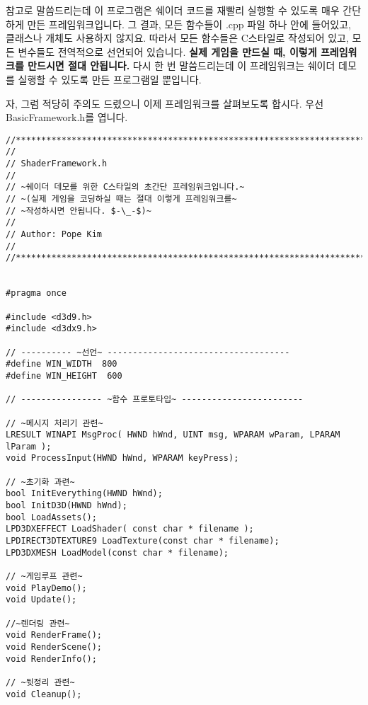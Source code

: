 참고로 말씀드리는데 이 프로그램은 쉐이더 코드를 재빨리 실행할 수 있도록 매우 간단하게 만든 프레임워크입니다. 그 결과, 모든 함수들이 .cpp 파일 하나 안에 들어있고, 클래스나 개체도 사용하지 않지요. 따라서 모든 함수들은 C스타일로 작성되어 있고, 모든 변수들도 전역적으로 선언되어 있습니다. \textbf{실제 게임을 만드실 때, 이렇게 프레임워크를 만드시면 절대 안됩니다.} 다시 한 번 말씀드리는데 이 프레임워크는 쉐이더 데모를 실행할 수 있도록 만든 프로그램일 뿐입니다.

자, 그럼 적당히 주의도 드렸으니 이제 프레임워크를 살펴보도록 합시다. 우선 BasicFramework.h를 엽니다.

\begin{lstlisting}[style = CStyle,escapeinside=~~]    
//**********************************************************************
//
// ShaderFramework.h
//
// ~쉐이더 데모를 위한 C스타일의 초간단 프레임워크입니다.~
// ~(실제 게임을 코딩하실 때는 절대 이렇게 프레임워크를~
// ~작성하시면 안됩니다. $-\_-$)~
//
// Author: Pope Kim
//
//**********************************************************************


#pragma once

#include <d3d9.h>
#include <d3dx9.h>

// ---------- ~선언~ ------------------------------------
#define WIN_WIDTH  800
#define WIN_HEIGHT  600

// ---------------- ~함수 프로토타입~ ------------------------

// ~메시지 처리기 관련~
LRESULT WINAPI MsgProc( HWND hWnd, UINT msg, WPARAM wParam, LPARAM lParam );
void ProcessInput(HWND hWnd, WPARAM keyPress);

// ~초기화 과련~
bool InitEverything(HWND hWnd);
bool InitD3D(HWND hWnd);
bool LoadAssets();
LPD3DXEFFECT LoadShader( const char * filename );
LPDIRECT3DTEXTURE9 LoadTexture(const char * filename);
LPD3DXMESH LoadModel(const char * filename);

// ~게임루프 관련~
void PlayDemo();
void Update();

//~렌더링 관련~
void RenderFrame();
void RenderScene();
void RenderInfo();

// ~뒷정리 관련~
void Cleanup();
\end{lstlisting}


